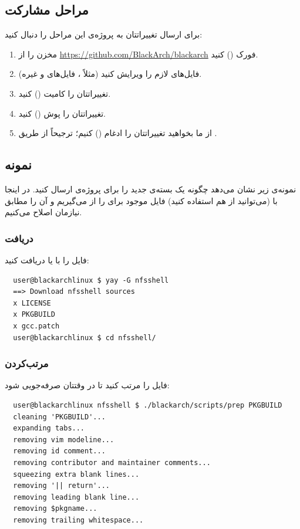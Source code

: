 \documentclass[a4paper, oneside, 11pt]{book}
\begin{document}
\subsection{مراحل مشارکت}
برای ارسال تغییراتتان به پروژه‌ی  این مراحل را دنبال کنید:
\begin{enumerate}
\item مخزن را از
\url{https://github.com/BlackArch/blackarch}
فورک () کنید.
\item فایل‌های لازم را ویرایش کنید (مثلاً ، فایل‌های  و
غیره).
\item تغییراتتان را کامیت () کنید.
\item تغییراتتان را پوش () کنید.
\item از ما بخواهید تغییراتتان را ادغام () کنیم؛ ترجیحاً از طریق
.
\end{enumerate}

\subsection{نمونه}
نمونه‌ی زیر نشان می‌دهد چگونه یک بسته‌ی جدید را برای پروژه‌ی  ارسال
کنید. در اینجا با \href{https://github.com/Jguer/yay}{}
(می‌توانید از  هم استفاده کنید) فایل  موجود برای
\textbf{} را از \href{https://aur.archlinux.org/}{} می‌گیریم و
آن را مطابق نیازمان اصلاح می‌کنیم.

\subsubsection{دریافت }
فایل \textit{} را با  یا  دریافت کنید:
\begin{latin}
\begin{lstlisting}
  user@blackarchlinux $ yay -G nfsshell
  ==> Download nfsshell sources
  x LICENSE
  x PKGBUILD
  x gcc.patch
  user@blackarchlinux $ cd nfsshell/
\end{lstlisting}
\end{latin}

\subsubsection{مرتب‌کردن }
فایل \textit{} را مرتب کنید تا در وقتتان صرفه‌جویی شود:
\begin{latin}
\begin{lstlisting}
  user@blackarchlinux nfsshell $ ./blackarch/scripts/prep PKGBUILD
  cleaning 'PKGBUILD'...
  expanding tabs...
  removing vim modeline...
  removing id comment...
  removing contributor and maintainer comments...
  squeezing extra blank lines...
  removing '|| return'...
  removing leading blank line...
  removing $pkgname...
  removing trailing whitespace...
\end{lstlisting}
\end{latin}
\end{document}
